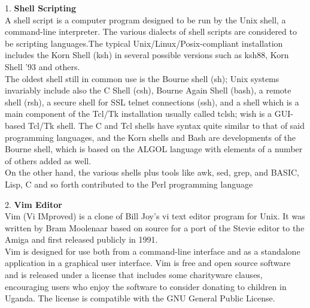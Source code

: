 \documentclass[11pt]{report}
\begin{document}
\begin{flushleft}
1. \textbf{Shell Scripting}\\
A shell script is a computer program designed to be run by the Unix shell, a command-line interpreter. The various dialects of shell scripts are considered to be scripting languages.The typical Unix/Linux/Posix-compliant installation includes the Korn Shell (ksh) in several possible versions such as ksh88, Korn Shell '93 and others.\\
The oldest shell still in common use is the Bourne shell (sh); Unix systems invariably include also the C Shell (csh), Bourne Again Shell (bash), a remote shell (rsh), a secure shell for SSL telnet connections (ssh), and a shell which is a main component of the Tcl/Tk installation usually called tclsh; wish is a GUI-based Tcl/Tk shell. The C and Tcl shells have syntax quite similar to that of said programming languages, and the Korn shells and Bash are developments of the Bourne shell, which is based on the ALGOL language with elements of a number of others added as well.\\
On the other hand, the various shells plus tools like awk, sed, grep, and BASIC, Lisp, C and so forth contributed to the Perl programming language\\
\end{flushleft}

\begin{flushleft}
2. \textbf{Vim Editor}\\
 
Vim (Vi IMproved) is a clone of Bill Joy's vi text editor program for Unix. It was written by Bram Moolenaar based on source for a port of the Stevie editor to the Amiga and first released publicly in 1991.\\
Vim is designed for use both from a command-line interface and as a standalone application in a graphical user interface. Vim is free and open source software and is released under a license that includes some charityware clauses, encouraging users who enjoy the software to consider donating to children in Uganda. The license is compatible with the GNU General Public License.\\
\end{flushleft}
\newpage
\end{document}
